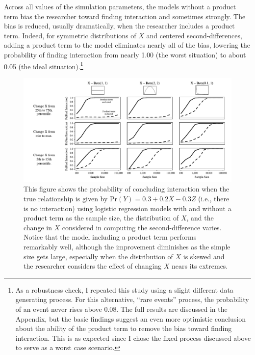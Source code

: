 \documentclass[12pt]{article}
\begin{document}
Across all values of the simulation parameters, the models without a product term bias the researcher toward finding interaction and sometimes strongly. The bias is reduced, usually dramatically, when the researcher includes a product term. Indeed, for symmetric distributions of $X$ and centered second-differences, adding a product term to the model eliminates nearly all of the bias, lowering the probability of finding interaction
from nearly 1.00 (the worst  situation) to about 0.05 (the ideal situation).\footnote{As a robustness check, I repeated this study using a slight different data generating process. For this alternative, ``rare events'' process, the probability of an event never rises above 0.08. The full results are discussed in the Appendix, but the basic findings suggest an even more optimistic conclusion about the ability of the product term to remove the bias toward finding interaction. This is as expected since I chose the fixed process discussed above to serve as a worst case scenario.}

\begin{figure}
\begin{center}
\includegraphics[width=\linewidth]{fig/fig-fixed.pdf}
\end{center}
\caption{This figure shows the probability of concluding interaction when the true relationship is given by $\text{Pr}(Y) = 0.3 + 0.2X - 0.3Z$ (i.e., there is no interaction) using logistic regression models with and without a product term as the sample size, the distribution of $X$, and the change in $X$ considered in computing the second-difference varies. Notice that the model including a product term performs remarkably well, although the improvement diminishes as the simple size gets large, especially when the distribution of $X$ is skewed and the researcher considers the effect of changing $X$ nears its extremes.}\label{fig:fixed}
\end{figure}
\end{document}

